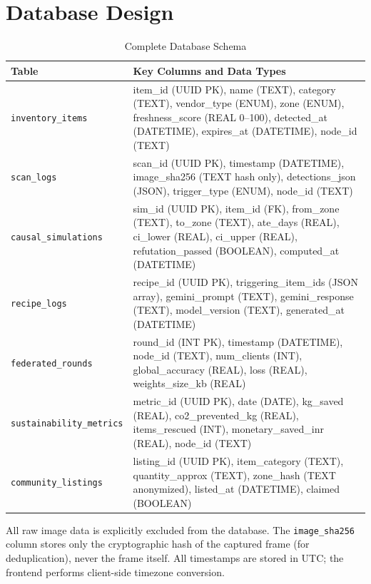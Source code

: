 \documentclass[12pt,a4paper]{report}
\begin{document}
\section{Database Design}

\begin{table}[ht]
\centering
\caption{Complete Database Schema}
\label{tab:schema}
\begin{tabularx}{\textwidth}{L{0.28\textwidth} L{0.67\textwidth}}
\toprule
\textbf{Table} & \textbf{Key Columns and Data Types} \\
\midrule
\texttt{inventory\_items} & item\_id (UUID PK), name (TEXT), category (TEXT), vendor\_type (ENUM), zone (ENUM), freshness\_score (REAL 0--100), detected\_at (DATETIME), expires\_at (DATETIME), node\_id (TEXT) \\
\texttt{scan\_logs} & scan\_id (UUID PK), timestamp (DATETIME), image\_sha256 (TEXT hash only), detections\_json (JSON), trigger\_type (ENUM), node\_id (TEXT) \\
\texttt{causal\_simulations} & sim\_id (UUID PK), item\_id (FK), from\_zone (TEXT), to\_zone (TEXT), ate\_days (REAL), ci\_lower (REAL), ci\_upper (REAL), refutation\_passed (BOOLEAN), computed\_at (DATETIME) \\
\texttt{recipe\_logs} & recipe\_id (UUID PK), triggering\_item\_ids (JSON array), gemini\_prompt (TEXT), gemini\_response (TEXT), model\_version (TEXT), generated\_at (DATETIME) \\
\texttt{federated\_rounds} & round\_id (INT PK), timestamp (DATETIME), node\_id (TEXT), num\_clients (INT), global\_accuracy (REAL), loss (REAL), weights\_size\_kb (REAL) \\
\texttt{sustainability\_metrics} & metric\_id (UUID PK), date (DATE), kg\_saved (REAL), co2\_prevented\_kg (REAL), items\_rescued (INT), monetary\_saved\_inr (REAL), node\_id (TEXT) \\
\texttt{community\_listings} & listing\_id (UUID PK), item\_category (TEXT), quantity\_approx (TEXT), zone\_hash (TEXT anonymized), listed\_at (DATETIME), claimed (BOOLEAN) \\
\bottomrule
\end{tabularx}
\end{table}

All raw image data is explicitly excluded from the database. The \texttt{image\_sha256} column stores only the cryptographic hash of the captured frame (for deduplication), never the frame itself. All timestamps are stored in UTC; the frontend performs client-side timezone conversion.
\end{document}
